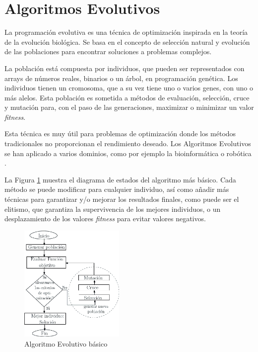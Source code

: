 \section{Algoritmos Evolutivos}


	La programación evolutiva es una técnica de optimización inspirada en la teoría de la evolución biológica. Se basa en el concepto de selección natural y evolución de las poblaciones para encontrar soluciones a problemas complejos. 
	
	La población está compuesta por individuos, que pueden ser representados con arrays de números reales, binarios o un árbol, en programación genética. Los individuos tienen un cromosoma, que a su vez tiene uno o varios genes, con uno o más alelos. Esta población es sometida a métodos de evaluación, selección, cruce y mutación para, con el paso de las generaciones, maximizar o minimizar un valor \textit{fitness}.
	
	Esta técnica es muy útil para problemas de optimización donde los métodos tradicionales no proporcionan el rendimiento deseado. Los Algoritmos Evolutivos se han aplicado a varios dominios, como por ejemplo la bioinformática o robótica \cite{contreras2015mobile}.
	
	La Figura \ref{fig:AG} muestra el diagrama de estados del algoritmo más básico. Cada método se puede modificar para cualquier individuo, así como añadir más técnicas para garantizar y/o mejorar los resultados finales, como puede ser el elitismo, que garantiza la supervivencia de los mejores individuos, o un desplazamiento de los valores \textit{fitness} para evitar valores negativos. 


	\begin{figure}[!h]
		\centering
		\includegraphics[width=0.45\textwidth]{images/chapter_2/AG}
		\caption{Algoritmo Evolutivo básico}
		\label{fig:AG}
	\end{figure}




